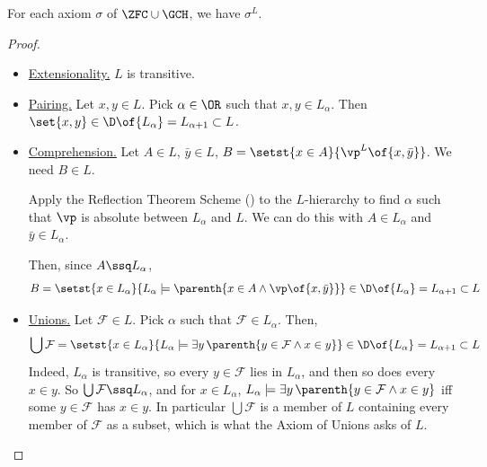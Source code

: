 \begin{boxtheorem}[Gödel] \label{Ch3:Thm:Godel}
    For each axiom $\sigma$ of $\ZFC \cup \GCH$, we have $\sigma^{L}$.
\end{boxtheorem}
\begin{proof}
    \hfill
    \begin{itemize}
        \item \underline{Extensionality.} $L$ is transitive.

        \item \underline{Pairing.} Let $x, y \in L$. Pick $\alpha \in \OR$ such that $x, y \in L_{\alpha}$. Then $\set{x, y} \in \D\of{L_{\alpha}} = L_{\alpha + 1} \subset L$.

        \item \underline{Comprehension.} Let $A \in L$, $\bar{y} \in L$, $B = \setst{x \in A}{\vp^L\of{x, \bar{y}}}$. We need $B \in L$.

        Apply the Reflection Theorem Scheme () to the $L$-hierarchy to find $\alpha$ such that $\vp$ is absolute between $L_{\alpha}$ and $L$. We can do this with $A \in L_{\alpha}$ and $\bar{y} \in L_{\alpha}$.

        Then, since $A \ssq L_{\alpha}$,
        \begin{align*}
            B
            = \setst{x \in L_{\alpha}}{L_{\alpha} \models \parenth{x \in A \land \vp\of{x, \bar{y}}}}
            \in \D\of{L_{\alpha}} = L_{\alpha + 1} \subset L
        \end{align*}

        \item \underline{Unions.} Let $\mathcal{F} \in L$. Pick $\alpha$ such that $\mathcal{F} \in L_{\alpha}$. Then,
        \begin{align*}
            \bigcup \mathcal{F}
            = \setst{x \in L_{\alpha}}{L_{\alpha} \models \exists y \, \parenth{y \in \mathcal{F} \land x \in y}}
            \in \D\of{L_{\alpha}} = L_{\alpha + 1} \subset L
        \end{align*}
        Indeed, $L_{\alpha}$ is transitive, so every $y \in \mathcal{F}$ lies in $L_{\alpha}$, and then so does every $x \in y$. So $\bigcup \mathcal{F} \ssq L_{\alpha}$, and for $x \in L_{\alpha}$, $L_{\alpha} \models \exists y \, \parenth{y \in \mathcal{F} \land x \in y}$ iff some $y \in \mathcal{F}$ has $x \in y$. In particular $\bigcup \mathcal{F}$ is a member of $L$ containing every member of $\mathcal{F}$ as a subset, which is what the Axiom of Unions asks of $L$.


\end{itemize}
\end{proof}
